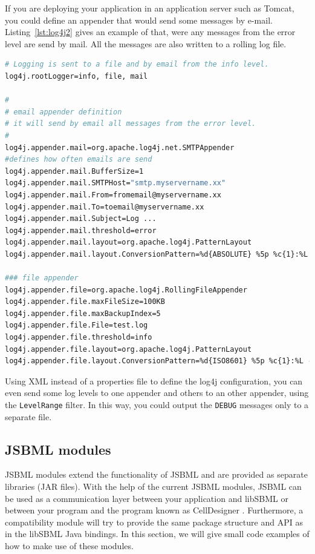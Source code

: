 If you are deploying your application in an application server such as Tomcat,
you could define an appender that would send some messages by e-mail.
Listing~\vref{lst:log4j2} gives an example of that, were any messages from the
error level
%
are send by mail. All the messages are also written to a rolling log
file.
\begin{lstlisting}[language=bash,%numbers=none,
caption={SMTPAppender log4j example.}, label=lst:log4j2]
# Logging is sent to a file and by email from the info level.
log4j.rootLogger=info, file, mail

#
# email appender definition
# it will send by email all messages from the error level.
#
log4j.appender.mail=org.apache.log4j.net.SMTPAppender
#defines how often emails are send
log4j.appender.mail.BufferSize=1
log4j.appender.mail.SMTPHost="smtp.myservername.xx"
log4j.appender.mail.From=fromemail@myservername.xx
log4j.appender.mail.To=toemail@myservername.xx
log4j.appender.mail.Subject=Log ...
log4j.appender.mail.threshold=error
log4j.appender.mail.layout=org.apache.log4j.PatternLayout
log4j.appender.mail.layout.ConversionPattern=%d{ABSOLUTE} %5p %c{1}:%L - %m%n

### file appender
log4j.appender.file=org.apache.log4j.RollingFileAppender
log4j.appender.file.maxFileSize=100KB
log4j.appender.file.maxBackupIndex=5
log4j.appender.file.File=test.log
log4j.appender.file.threshold=info
log4j.appender.file.layout=org.apache.log4j.PatternLayout
log4j.appender.file.layout.ConversionPattern=%d{ISO8601} %5p %c{1}:%L - %m%n
\end{lstlisting}

Using XML instead of a properties file to define the log4j configuration, you
can even send some log levels to one appender and others to an
other appender, using the \texttt{LevelRange} filter. In this way, you could
output the \texttt{DEBUG} messages only to a separate file.


\subsection{JSBML modules}

JSBML modules extend the functionality of JSBML and are provided as separate
libraries (JAR files). With the help of the current JSBML modules, JSBML can be
used as a communication layer  between your
application and libSBML \citep{Bornstein2008} or between your program and the
program known as CellDesigner \citep{Funahashi2003}. Furthermore, a
compatibility module
%
will try to provide the same package structure and API as in the libSBML Java
bindings. In this section, we will give small code examples of how to make use
of these modules.

